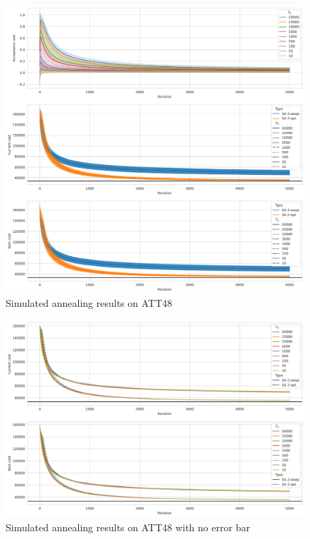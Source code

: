 \begin{figure}
    \centering
    \includegraphics[height=0.5\textheight]{images/att48_sa.png}
    \caption{Simulated annealing results on ATT48}
    \label{fig:att48-sa}
\end{figure}

\begin{figure}
    \centering
    \includegraphics[height=0.4\textheight]{images/att48-no-error.png}
    \caption{Simulated annealing results on ATT48 with no error bar}
    \label{fig:att48-ne}
\end{figure}

